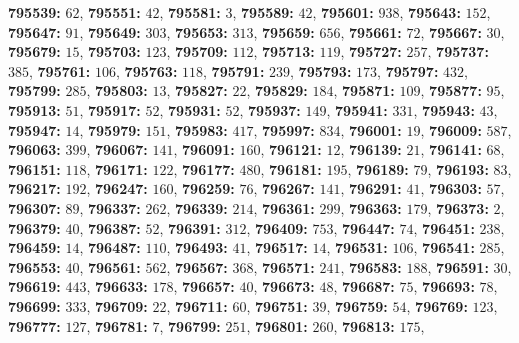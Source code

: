 \textsf{\bfseries 795539:} $62$, \textsf{\bfseries 795551:} $42$, \textsf{\bfseries 795581:} $3$, \textsf{\bfseries 795589:} $42$, \textsf{\bfseries 795601:} $938$, \textsf{\bfseries 795643:} $152$, \textsf{\bfseries 795647:} $91$, \textsf{\bfseries 795649:} $303$, \textsf{\bfseries 795653:} $313$, \textsf{\bfseries 795659:} $656$, \textsf{\bfseries 795661:} $72$, \textsf{\bfseries 795667:} $30$, \textsf{\bfseries 795679:} $15$, \textsf{\bfseries 795703:} $123$, \textsf{\bfseries 795709:} $112$, \textsf{\bfseries 795713:} $119$, \textsf{\bfseries 795727:} $257$, \textsf{\bfseries 795737:} $385$, \textsf{\bfseries 795761:} $106$, \textsf{\bfseries 795763:} $118$, \textsf{\bfseries 795791:} $239$, \textsf{\bfseries 795793:} $173$, \textsf{\bfseries 795797:} $432$, \textsf{\bfseries 795799:} $285$, \textsf{\bfseries 795803:} $13$, \textsf{\bfseries 795827:} $22$, \textsf{\bfseries 795829:} $184$, \textsf{\bfseries 795871:} $109$, \textsf{\bfseries 795877:} $95$, \textsf{\bfseries 795913:} $51$, \textsf{\bfseries 795917:} $52$, \textsf{\bfseries 795931:} $52$, \textsf{\bfseries 795937:} $149$, \textsf{\bfseries 795941:} $331$, \textsf{\bfseries 795943:} $43$, \textsf{\bfseries 795947:} $14$, \textsf{\bfseries 795979:} $151$, \textsf{\bfseries 795983:} $417$, \textsf{\bfseries 795997:} $834$, \textsf{\bfseries 796001:} $19$, \textsf{\bfseries 796009:} $587$, \textsf{\bfseries 796063:} $399$, \textsf{\bfseries 796067:} $141$, \textsf{\bfseries 796091:} $160$, \textsf{\bfseries 796121:} $12$, \textsf{\bfseries 796139:} $21$, \textsf{\bfseries 796141:} $68$, \textsf{\bfseries 796151:} $118$, \textsf{\bfseries 796171:} $122$, \textsf{\bfseries 796177:} $480$, \textsf{\bfseries 796181:} $195$, \textsf{\bfseries 796189:} $79$, \textsf{\bfseries 796193:} $83$, \textsf{\bfseries 796217:} $192$, \textsf{\bfseries 796247:} $160$, \textsf{\bfseries 796259:} $76$, \textsf{\bfseries 796267:} $141$, \textsf{\bfseries 796291:} $41$, \textsf{\bfseries 796303:} $57$, \textsf{\bfseries 796307:} $89$, \textsf{\bfseries 796337:} $262$, \textsf{\bfseries 796339:} $214$, \textsf{\bfseries 796361:} $299$, \textsf{\bfseries 796363:} $179$, \textsf{\bfseries 796373:} $2$, \textsf{\bfseries 796379:} $40$, \textsf{\bfseries 796387:} $52$, \textsf{\bfseries 796391:} $312$, \textsf{\bfseries 796409:} $753$, \textsf{\bfseries 796447:} $74$, \textsf{\bfseries 796451:} $238$, \textsf{\bfseries 796459:} $14$, \textsf{\bfseries 796487:} $110$, \textsf{\bfseries 796493:} $41$, \textsf{\bfseries 796517:} $14$, \textsf{\bfseries 796531:} $106$, \textsf{\bfseries 796541:} $285$, \textsf{\bfseries 796553:} $40$, \textsf{\bfseries 796561:} $562$, \textsf{\bfseries 796567:} $368$, \textsf{\bfseries 796571:} $241$, \textsf{\bfseries 796583:} $188$, \textsf{\bfseries 796591:} $30$, \textsf{\bfseries 796619:} $443$, \textsf{\bfseries 796633:} $178$, \textsf{\bfseries 796657:} $40$, \textsf{\bfseries 796673:} $48$, \textsf{\bfseries 796687:} $75$, \textsf{\bfseries 796693:} $78$, \textsf{\bfseries 796699:} $333$, \textsf{\bfseries 796709:} $22$, \textsf{\bfseries 796711:} $60$, \textsf{\bfseries 796751:} $39$, \textsf{\bfseries 796759:} $54$, \textsf{\bfseries 796769:} $123$, \textsf{\bfseries 796777:} $127$, \textsf{\bfseries 796781:} $7$, \textsf{\bfseries 796799:} $251$, \textsf{\bfseries 796801:} $260$, \textsf{\bfseries 796813:} $175$, 
